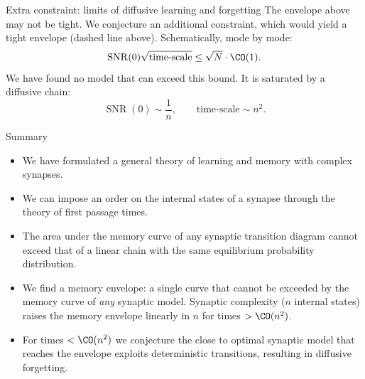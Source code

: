 \documentclass[final,hyperref={pdfpagelabels=false,bookmarks=false}]{beamer}
\DeclareMathOperator{\SNR}{SNR}
\begin{document}
\begin{frame}{}
\begin{columns}[t]
\begin{column}{0.32\linewidth}
\begin{block}{Extra constraint: limits of diffusive learning and forgetting}
%
 The envelope above may not be tight.
 We conjecture an additional constraint, which would yield a tight envelope (dashed line above).
 Schematically, mode by mode:
 \begin{equation*}
   \SNR(0)\sqrt{\text{time-scale}} \leq \sqrt{N}\cdot \CO(1).
 \end{equation*}
 We have found no model that can exceed this bound.
 It is saturated by a diffusive chain:
 \begin{equation*}
   \SNR(0) \sim \frac{1}{n},
   \qquad
   \text{time-scale} \sim n^2.
 \end{equation*}
%
\end{block}

%



\begin{block}{Summary}
%
  \begin{itemize}
    \item We have formulated a general theory of learning and memory with complex synapses.
    \item We can impose an order on the internal states of a synapse through the theory of first passage times.
    \item The area under the memory curve of any synaptic transition diagram cannot exceed that of a linear chain with the same equilibrium probability distribution.
    \item We find a memory envelope: a single curve that cannot be exceeded by the memory curve of \emph{any} synaptic model.
        Synaptic complexity ($n$ internal states) raises the memory envelope linearly in $n$ for times $> \CO(n^2)$.
    \item For times $< \CO(n^2)$ we conjecture the close to optimal synaptic model that reaches the envelope exploits deterministic transitions, resulting in diffusive forgetting.
  \end{itemize}
%
\end{block}


\end{column}
\end{columns}
\end{frame}
\end{document}
